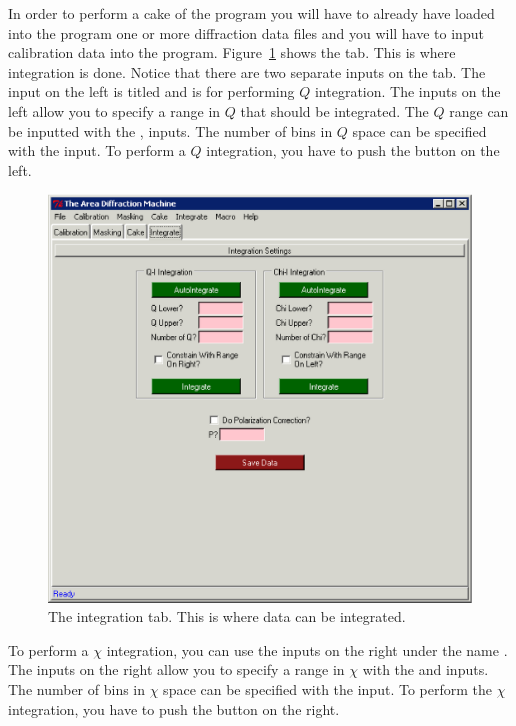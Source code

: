 In order to perform a cake of the program you will have to 
already have loaded into the program one or more diffraction
data files and you will have to input calibration data
into the program. Figure~\ref{integration_tab} shows the
 tab. This is where integration is done.
Notice that there are two separate inputs on the tab. 
The input on the left is titled 
and is for performing $Q$ integration.
The inputs on the left allow you to specify a
range in $Q$ that should be integrated.
The $Q$ range can be inputted with the
,  inputs. The number of
bins in $Q$ space can be specified with the
 input. 
To perform a $Q$ integration, you have to push
the  button on the left.

\begin{figure}
    \centering
    \includegraphics[scale=.75]{figures/integration_tab.eps}
    \caption{The integration tab. This is where data
    can be integrated.} 
    \label{integration_tab}
\end{figure}

To perform a $\chi$ integration, you can use the inputs
on the right under the name .
The inputs on the right allow you to specify
a range in $\chi$ with the  and
 inputs. The number of bins in
$\chi$ space can be specified with the
 input. To perform the
$\chi$ integration, you have to push the
 button on the right.

